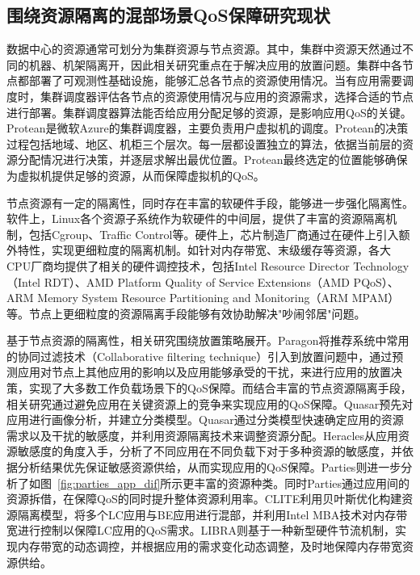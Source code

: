 \subsection{围绕资源隔离的混部场景QoS保障研究现状}


数据中心的资源通常可划分为集群资源与节点资源。其中，集群中资源天然通过不同的机器、机架隔离开，因此相关研究重点在于解决应用的放置问题。集群中各节点都部署了可观测性基础设施，能够汇总各节点的资源使用情况。当有应用需要调度时，集群调度器评估各节点的资源使用情况与应用的资源需求，选择合适的节点进行部署。集群调度器算法能否给应用分配足够的资源，是影响应用QoS的关键。Protean\citep{hadary2020protean}是微软Azure的集群调度器，主要负责用户虚拟机的调度。Protean的决策过程包括地域、地区、机柜三个层次。每一层都设置独立的算法，依据当前层的资源分配情况进行决策，并逐层求解出最优位置。Protean最终选定的位置能够确保为虚拟机提供足够的资源，从而保障虚拟机的QoS。

节点资源有一定的隔离性，同时存在丰富的软硬件手段，能够进一步强化隔离性。软件上，Linux各个资源子系统作为软硬件的中间层，提供了丰富的资源隔离机制，包括Cgroup、Traffic Control等。硬件上，芯片制造厂商通过在硬件上引入额外特性，实现更细粒度的隔离机制。如针对内存带宽、末级缓存等资源，各大CPU厂商均提供了相关的硬件调控技术，包括Intel Resource Director Technology（Intel RDT）\citep{guide2011intel}、AMD Platform Quality of Service Extensions（AMD PQoS）\citep{amdpqos}、ARM Memory System Resource Partitioning and Monitoring（ARM MPAM）\citep{armmpam}等。节点上更细粒度的资源隔离手段能够有效协助解决"吵闹邻居"问题\citep{xu2018dcat, maricq2018taming, rzadca2020autopilot, kwon2020dc}。

基于节点资源的隔离性，相关研究围绕放置策略展开。Paragon\citep{delimitrou2013paragon}将推荐系统中常用的协同过滤技术（Collaborative filtering technique）引入到放置问题中，通过预测应用对节点上其他应用的影响以及应用能够承受的干扰，来进行应用的放置决策，实现了大多数工作负载场景下的QoS保障。而结合丰富的节点资源隔离手段，相关研究通过避免应用在关键资源上的竞争来实现应用的QoS保障。Quasar\citep{delimitrou2014quasar}预先对应用进行画像分析，并建立分类模型。Quasar通过分类模型快速确定应用的资源需求以及干扰的敏感度，并利用资源隔离技术来调整资源分配。Heracles\citep{lo2015heracles}从应用资源敏感度的角度入手，分析了不同应用在不同负载下对于多种资源的敏感度，并依据分析结果优先保证敏感资源供给，从而实现应用的QoS保障。Parties\citep{chen2019parties}则进一步分析了如图~\ref{fig:parties_app_dif}所示更丰富的资源种类。同时Parties通过应用间的资源拆借，在保障QoS的同时提升整体资源利用率。CLITE\citep{patel2020clite}利用贝叶斯优化构建资源隔离模型，将多个LC应用与BE应用进行混部，并利用Intel MBA技术对内存带宽进行控制以保障LC应用的QoS需求。LIBRA\citep{zhang2021libra}则基于一种新型硬件节流机制，实现内存带宽的动态调控，并根据应用的需求变化动态调整，及时地保障内存带宽资源供给。

